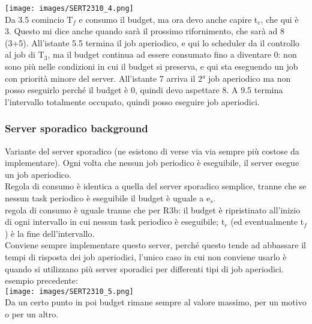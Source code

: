 \documentclass[18px]{article}
\begin{document}
\texttt{[image: images/SERT2310\_4.png]}\\
Da 3.5 comincio T$_{f}$ e consumo il budget, ma ora devo anche capire t$_{e}$, che qui è 3. Questo mi dice anche quando sarà il prossimo rifornimento, che sarà ad 8 (3+5). All'istante 5.5 termina il job aperiodico, e qui lo scheduler da il controllo al job di T$_{3}$, ma il budget continua ad essere consumato fino a diventare 0: non sono più nelle condizioni in cui il budget si preserva, e qui sta eseguendo un job con priorità minore del server. All'istante 7 arriva il 2° job aperiodico ma non posso eseguirlo perché il budget è 0, quindi devo aspettare 8. A 9.5 termina l'intervallo totalmente occupato, quindi posso eseguire job aperiodici.
\subsubsection{Server sporadico background}
Variante del server sporadico (ne esistono di verse via via sempre più costose da implementare). Ogni volta che nessun job periodico è eseguibile, il server esegue un job aperiodico.\\ Regola di consumo è identica a quella del server sporadico semplice, tranne che se nessun task periodico è eseguibile il budget è uguale a e$_{s}$. \\ regola di consumo è uguale tranne che per R3b: il budget è ripristinato all'inizio di ogni intervallo in cui nessun task periodico è eseguibile; t$_{r}$ (ed eventualmente t$_{f}$) è la fine dell'intervallo.\\ Conviene sempre implementare questo server, perché questo tende ad abbassare il tempi di risposta dei job aperiodici, l'unico caso in cui non conviene usarlo è quando si utilizzano più server sporadici per differenti tipi di job aperiodici.\\ esempio precedente:\\
\texttt{[image: images/SERT2310\_5.png]}\\ 
Da un certo punto in poi budget rimane sempre al valore massimo, per un motivo o per un altro.
\end{document}
